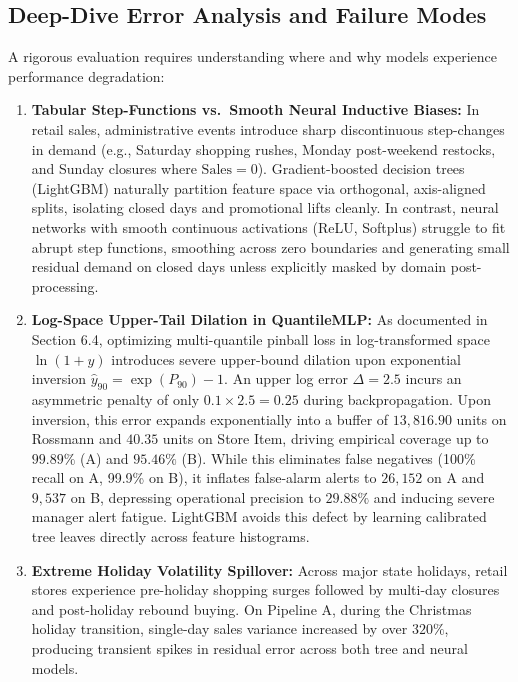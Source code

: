 \documentclass[11pt,a4paper]{article}
\begin{document}
\subsection{Deep-Dive Error Analysis and Failure Modes}
A rigorous evaluation requires understanding where and why models experience performance degradation:
\begin{enumerate}
    \item \textbf{Tabular Step-Functions vs.\ Smooth Neural Inductive Biases:} In retail sales, administrative events introduce sharp discontinuous step-changes in demand (e.g., Saturday shopping rushes, Monday post-weekend restocks, and Sunday closures where $\text{Sales} = 0$). Gradient-boosted decision trees (LightGBM) naturally partition feature space via orthogonal, axis-aligned splits, isolating closed days and promotional lifts cleanly. In contrast, neural networks with smooth continuous activations (ReLU, Softplus) struggle to fit abrupt step functions, smoothing across zero boundaries and generating small residual demand on closed days unless explicitly masked by domain post-processing.
    \item \textbf{Log-Space Upper-Tail Dilation in QuantileMLP:} As documented in Section 6.4, optimizing multi-quantile pinball loss in log-transformed space $\ln(1+y)$ introduces severe upper-bound dilation upon exponential inversion $\hat{y}_{90} = \exp(P_{90}) - 1$. An upper log error $\Delta = 2.5$ incurs an asymmetric penalty of only $0.1 \times 2.5 = 0.25$ during backpropagation. Upon inversion, this error expands exponentially into a buffer of $13,816.90$ units on Rossmann and $40.35$ units on Store Item, driving empirical coverage up to $99.89\%$ (A) and $95.46\%$ (B). While this eliminates false negatives (100\% recall on A, 99.9\% on B), it inflates false-alarm alerts to $26,152$ on A and $9,537$ on B, depressing operational precision to $29.88\%$ and inducing severe manager alert fatigue. LightGBM avoids this defect by learning calibrated tree leaves directly across feature histograms.
    \item \textbf{Extreme Holiday Volatility Spillover:} Across major state holidays, retail stores experience pre-holiday shopping surges followed by multi-day closures and post-holiday rebound buying. On Pipeline A, during the Christmas holiday transition, single-day sales variance increased by over $320\%$, producing transient spikes in residual error across both tree and neural models.
\end{enumerate}
\end{document}
